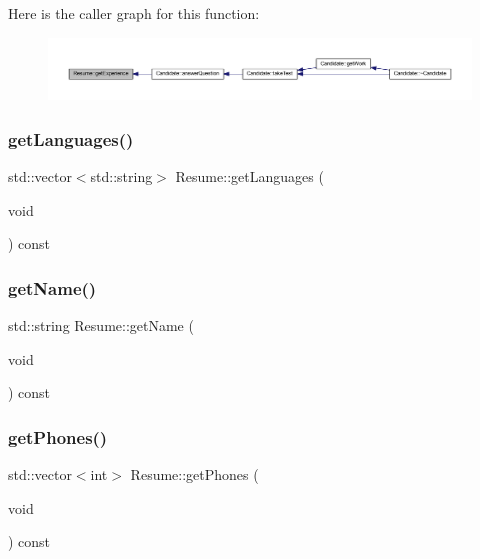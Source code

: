 Here is the caller graph for this function\+:
\nopagebreak
\begin{figure}[H]
\begin{center}
\leavevmode
\includegraphics[width=350pt]{class_resume_ad8abe2f52e3a5b4f730c87ab297ea99a_icgraph}
\end{center}
\end{figure}
\hypertarget{class_resume_a48cfbd4c9c8a100deb4656b7f83402cc}{}\label{class_resume_a48cfbd4c9c8a100deb4656b7f83402cc} 
\subsubsection{\texorpdfstring{get\+Languages()}{getLanguages()}}
{\footnotesize\ttfamily std\+::vector$<$std\+::string$>$ Resume\+::get\+Languages (\begin{DoxyParamCaption}\item[{void}]{ }\end{DoxyParamCaption}) const\hspace{0.3cm}{\ttfamily [inline]}}

\hypertarget{class_resume_a7e20376daab81badef8a7edfa1f422d8}{}\label{class_resume_a7e20376daab81badef8a7edfa1f422d8} 
\subsubsection{\texorpdfstring{get\+Name()}{getName()}}
{\footnotesize\ttfamily std\+::string Resume\+::get\+Name (\begin{DoxyParamCaption}\item[{void}]{ }\end{DoxyParamCaption}) const\hspace{0.3cm}{\ttfamily [inline]}}

\hypertarget{class_resume_a3ca8f1b8a98de8dfe7ac3897f2577ca2}{}\label{class_resume_a3ca8f1b8a98de8dfe7ac3897f2577ca2} 
\subsubsection{\texorpdfstring{get\+Phones()}{getPhones()}}
{\footnotesize\ttfamily std\+::vector$<$int$>$ Resume\+::get\+Phones (\begin{DoxyParamCaption}\item[{void}]{ }\end{DoxyParamCaption}) const\hspace{0.3cm}{\ttfamily [inline]}}

